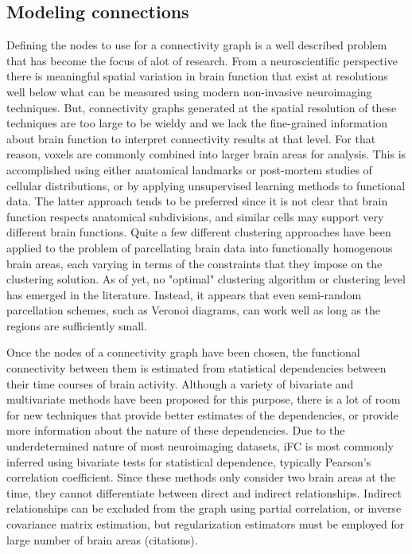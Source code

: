 \subsection{Modeling connections}

Defining the nodes to use for a connectivity graph is a well described problem that has become the focus of alot of research. From a neuroscientific perspective there is meaningful spatial variation in brain function that exist at resolutions well below what can be measured using modern non-invasive neuroimaging techniques. But, connectivity graphs generated at the spatial resolution of these techniques are too large to be wieldy and we lack the fine-grained information about brain function to interpret connectivity results at that level. For that reason, voxels are commonly combined into larger brain areas for analysis. This is accomplished using either anatomical landmarks or post-mortem studies of cellular distributions, or by applying unsupervised learning methods to functional data. The latter approach tends to be preferred since it is not clear that brain function respects anatomical subdivisions, and similar cells may support very different brain functions. Quite a few different clustering approaches have been applied to the problem of parcellating brain data into functionally homogenous brain areas, each varying in terms of the constraints that they impose on the clustering solution. As of yet, no "optimal" clustering algorithm or clustering level has emerged in the literature. Instead, it appears that even semi-random parcellation schemes, such as Veronoi diagrams, can work well as long as the regions are sufficiently small.

Once the nodes of a connectivity graph have been chosen, the functional connectivity between them is estimated from statistical dependencies between their time courses of brain activity. Although a variety of bivariate and multivariate methods have been proposed for this purpose\cite{SmithNeuor2010,Varoquaux}, there is a lot of room for new techniques that provide better estimates of the dependencies, or provide more information about the nature of these dependencies. Due to the underdetermined nature of most neuroimaging datasets, iFC is most commonly inferred using bivariate tests for statistical dependence, typically Pearson's correlation coefficient. Since these methods only consider two brain areas at the time, they cannot differentiate between direct and indirect relationships. Indirect relationships can be excluded from the graph using partial correlation, or inverse covariance matrix estimation, but regularization estimators must be employed for large number of brain areas (citations).

